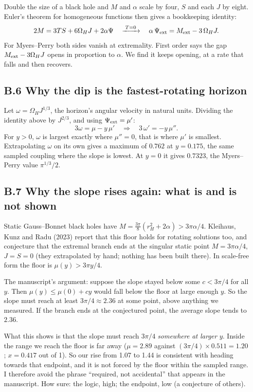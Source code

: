 \documentclass[12pt,a4paper]{article}
\begin{document}
Double the size of a black hole and $M$ and $\alpha$ scale by four, $S$ and each
$J$ by eight. Euler's theorem for homogeneous functions then gives a bookkeeping
identity:
\[
2M=3TS+6\Omega_HJ+2\alpha\Psi\quad\xrightarrow{\;T=0\;}\quad
\alpha\,\Psi_{\rm ext}=M_{\rm ext}-3\,\Omega_HJ .
\]
For Myers--Perry both sides vanish at extremality. First order says the gap
$M_{\rm ext}-3\Omega_HJ$ opens in proportion to $\alpha$. We find it keeps opening,
at a rate that falls and then recovers.

\subsection*{B.6 Why the dip is the fastest-rotating horizon}

Let $\omega=\Omega_HJ^{1/3}$, the horizon's angular velocity in natural units.
Dividing the identity above by $J^{2/3}$, and using $\Psi_{\rm ext}=\mu'$:
\[
3\omega=\mu-y\,\mu'\quad\Longrightarrow\quad 3\,\omega'=-y\,\mu'' .
\]
For $y>0$, $\omega$ is largest exactly where $\mu''=0$, that is where $\mu'$ is
smallest. Extrapolating $\omega$ on its own gives a maximum of $0.762$ at
$y=0.175$, the same sampled coupling where the slope is lowest. At $y=0$ it gives
$0.7323$, the Myers--Perry value $\pi^{1/3}/2$.

\subsection*{B.7 Why the slope rises again: what is and is not shown}

Static Gauss--Bonnet black holes have $M=\tfrac{3\pi}{8}(r_H^2+2\alpha)>3\pi\alpha/4$.
Kleihaus, Kunz and Radu (2023) report that this floor holds for rotating solutions
too, and conjecture that the extremal branch ends at the singular static point
$M=3\pi\alpha/4$, $J=S=0$ (they extrapolated by hand; nothing has been built
there). In scale-free form the floor is $\mu(y)>3\pi y/4$.

The manuscript's argument: suppose the slope stayed below some $c<3\pi/4$ for all
$y$. Then $\mu(y)\le\mu(0)+cy$ would fall below the floor at large enough $y$. So the
slope must reach at least $3\pi/4\approx2.36$ at some point, above anything we
measured. If the branch ends at the conjectured point, the average slope tends to
$2.36$.

What this shows is that the slope must reach $3\pi/4$ \emph{somewhere at larger $y$}.
Inside the range we reach the floor is far away ($\mu=2.89$ against
$(3\pi/4)\times0.511=1.20$; $x=0.417$ out of 1). So our rise from 1.07 to 1.44 is
consistent with heading towards that endpoint, and it is not forced by the floor
within the sampled range. I therefore avoid the phrase ``required, not accidental''
that appears in the manuscript. How sure: the logic, high; the endpoint, low (a
conjecture of others).
\end{document}
